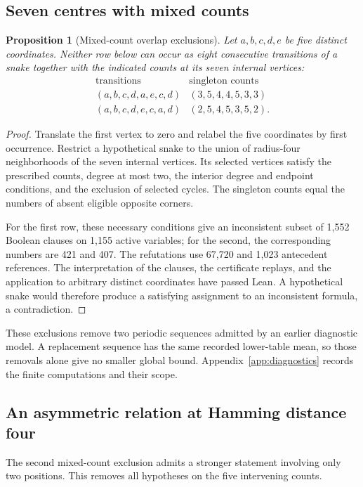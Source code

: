 \documentclass[11pt,a4paper]{article}
\newtheorem{proposition}[theorem]{Proposition}
\theoremstyle{definition}
\theoremstyle{remark}
\begin{document}
\subsection{Seven centres with mixed counts}\label{sec:critical-overlap}
\begin{proposition}[Mixed-count overlap exclusions]\label{prop:mixed-overlap}
Let $a,b,c,d,e$ be five distinct coordinates. Neither row below can occur as eight consecutive transitions of a snake together with the indicated counts at its seven internal vertices:
\[
\begin{array}{c|c}
\text{transitions}&\text{singleton counts}\\\hline
(a,b,c,d,a,e,c,d)&(3,5,4,4,5,3,3)\\
(a,b,c,d,e,c,a,d)&(2,5,4,5,3,5,2).
\end{array}
\]
\end{proposition}
\begin{proof}
Translate the first vertex to zero and relabel the five coordinates by first occurrence. Restrict a hypothetical snake to the union of radius-four neighborhoods of the seven internal vertices. Its selected vertices satisfy the prescribed counts, degree at most two, the interior degree and endpoint conditions, and the exclusion of selected cycles. The singleton counts equal the numbers of absent eligible opposite corners.

For the first row, these necessary conditions give an inconsistent subset of 1,552 Boolean clauses on 1,155 active variables; for the second, the corresponding numbers are 421 and 407. The refutations use 67,720 and 1,023 antecedent references. The interpretation of the clauses, the certificate replays, and the application to arbitrary distinct coordinates have passed Lean. A hypothetical snake would therefore produce a satisfying assignment to an inconsistent formula, a contradiction.
\end{proof}


These exclusions remove two periodic sequences admitted by an earlier diagnostic model. A replacement sequence has the same recorded lower-table mean, so those removals alone give no smaller global bound. Appendix~\ref{app:diagnostics} records the finite computations and their scope.

\subsection{An asymmetric relation at Hamming distance four}\label{sec:distance-four}
The second mixed-count exclusion admits a stronger statement involving only two positions. This removes all hypotheses on the five intervening counts.
\end{document}
